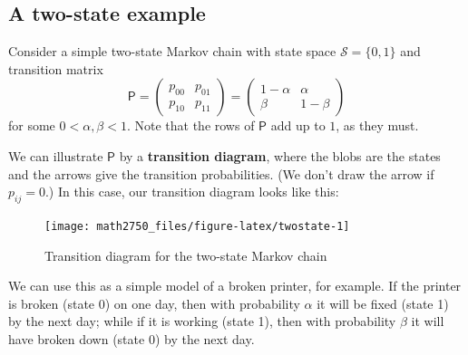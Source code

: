 \documentclass[
  a4paper,
]{article}
\theoremstyle{definition}
\theoremstyle{definition}
\theoremstyle{definition}
\theoremstyle{remark}
\begin{document}
\hypertarget{S05-example}{%
\subsection{A two-state example}\label{S05-example}}

Consider a simple two-state Markov chain with state space \(\mathcal S = \{0,1\}\) and transition matrix
\[ \mathsf P = \begin{pmatrix} p_{00} & p_{01} \\ p_{10} & p_{11} \end{pmatrix} = \begin{pmatrix} 1-\alpha & \alpha \\ \beta & 1-\beta \end{pmatrix}  \]
for some \(0 < \alpha, \beta < 1\). Note that the rows of \(\mathsf P\) add up to \(1\), as they must.

We can illustrate \(\mathsf P\) by a \textbf{transition diagram}, where the blobs are the states and the arrows give the transition probabilities. (We don't draw the arrow if \(p_{ij} = 0\).) In this case, our transition diagram looks like this:

\begin{figure}

{\centering \texttt{[image: math2750\_files/figure-latex/twostate-1]} 

}

\caption{Transition diagram for the two-state Markov chain}\label{fig:twostate}
\end{figure}

We can use this as a simple model of a broken printer, for example. If the printer is broken (state 0) on one day, then with probability \(\alpha\) it will be fixed (state 1) by the next day; while if it is working (state 1), then with probability \(\beta\) it will have broken down (state 0) by the next day.
\end{document}
